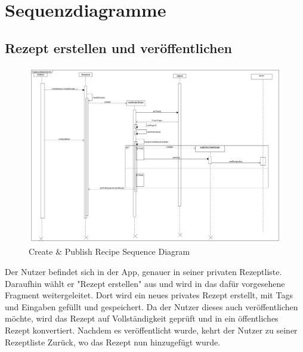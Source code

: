 \chapter{Sequenzdiagramme}

\section{Rezept erstellen und veröffentlichen }
\begin{figure}[H]
	\centering
	\includegraphics[width=\textwidth]{pics/dynamicDiagram/CreatePublishRecipeSequenceD.png}%
	\caption{Create \& Publish Recipe Sequence Diagram}%
	\label{diagram}%
\end{figure}

Der Nutzer befindet sich in der App, genauer in seiner privaten Rezeptliste. Daraufhin wählt er "Rezept erstellen" aus und wird in das dafür vorgesehene Fragment weitergeleitet. Dort wird ein neues privates Rezept erstellt, mit Tags und Eingaben gefüllt und gespeichert. Da der Nutzer dieses auch veröffentlichen möchte, wird das Rezept auf Vollständigkeit geprüft und in ein öffentliches Rezept konvertiert. Nachdem es veröffentlicht wurde, kehrt der Nutzer zu seiner Rezeptliste Zurück, wo das Rezept nun hinzugefügt wurde. 
  
  
  
  
